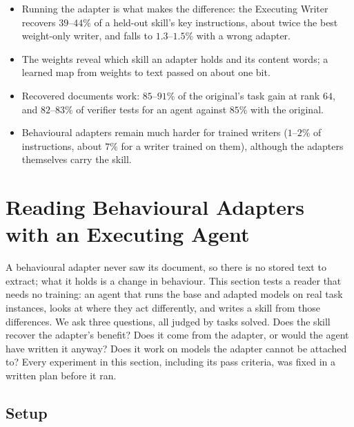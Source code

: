 \documentclass[11pt]{article}
\begin{document}
\begin{findings}
\begin{itemize}
\item Running the adapter is what makes the difference: the Executing Writer recovers $39$--$44\%$ of a held-out skill's key instructions, about twice the best weight-only writer, and falls to $1.3$--$1.5\%$ with a wrong adapter.
\item The weights reveal which skill an adapter holds and its content words; a learned map from weights to text passed on about one bit.
\item Recovered documents work: $85$--$91\%$ of the original's task gain at rank $64$, and $82$--$83\%$ of verifier tests for an agent against $85\%$
with the original.
\item Behavioural adapters remain much harder for trained writers ($1$--$2\%$ of instructions, about $7\%$ for a writer trained on them), although the adapters themselves carry the skill.
\end{itemize}
\end{findings}

\section{Reading Behavioural Adapters with an Executing Agent}
\label{sec:ax}

A behavioural adapter never saw its document, so there is no stored text to extract; what it holds is a change in behaviour. This section tests a
reader that needs no training: an agent that runs the base and adapted models on real task instances, looks at where they act differently, and
writes a skill from those differences. We ask three questions, all judged by tasks solved. Does the skill recover the adapter's benefit? Does it
come from the adapter, or would the agent have written it anyway? Does it work on models the adapter cannot be attached to? Every experiment in this
section, including its pass criteria, was fixed in a written plan before it ran.

\subsection{Setup}
\label{sec:ax-setup}
\end{document}
